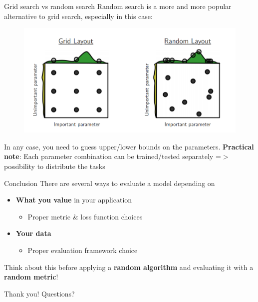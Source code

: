 \documentclass{beamer}
\newcommand{\1}[1]{\mathbbm{1}\left[#1\right]}
\begin{document}
\begin{frame}{Grid search vs random search}
Random search is a more and more popular alternative to grid search, especially in this case:
\vfill
\pause
\begin{figure}
\centering
\includegraphics[width=\textwidth]{images/random_search.png}
\end{figure}
\pause
\vfill
In any case, you need to guess upper/lower bounds on the parameters.
\pause
\vfill
\textbf{Practical note}: Each parameter combination can be trained/tested separately =$>$ possibility to distribute the tasks
\end{frame}

\begin{frame}{Conclusion}
There are several ways to evaluate a model depending on
\begin{itemize}
	\item \textbf{What you value} in your application
	\begin{itemize}
		\item Proper metric \& loss function choices
	\end{itemize}
	\item \textbf{Your data}
	\begin{itemize}
		\item Proper evaluation framework choice
	\end{itemize}
\end{itemize}
\vfill
\pause
Think about this before applying a \textbf{random algorithm} and evaluating it with a \textbf{random metric}!
\end{frame}

\begin{frame}
	\center
	\huge{Thank you! Questions?}
\end{frame}
\end{document}
